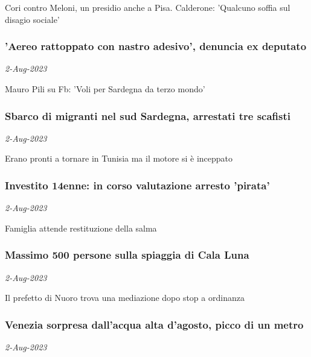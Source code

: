 Cori contro Meloni, un presidio anche a Pisa. Calderone: 'Qualcuno soffia sul disagio sociale'
\subsubsection{'Aereo rattoppato con nastro adesivo', denuncia ex deputato \href{https://www.ansa.it/sito/notizie/cronaca/2023/08/02/aereo-rattoppato-con-nastro-adesivo-denuncia-ex-deputato_18a14fb4-a29a-4e1f-8e12-03d2f6094a17.html}{}}
\textit{2-Aug-2023}

Mauro Pili su Fb: 'Voli per Sardegna da terzo mondo'
\subsubsection{Sbarco di migranti nel sud Sardegna, arrestati tre scafisti \href{https://www.ansa.it/sito/notizie/cronaca/2023/08/02/sbarco-di-migranti-nel-sud-sardegna-arrestati-tre-scafisti_6620a519-4687-46e4-98b9-65fbc0248696.html}{}}
\textit{2-Aug-2023}

Erano pronti a tornare in Tunisia ma il motore si \`{e} inceppato
\subsubsection{Investito 14enne: in corso valutazione arresto 'pirata' \href{https://www.ansa.it/sito/notizie/cronaca/2023/08/02/investito-14enne-in-corso-valutazione-arresto-pirata_c7e73b4e-58b7-4946-a551-a982b20171ab.html}{}}
\textit{2-Aug-2023}

Famiglia attende restituzione della salma
\subsubsection{Massimo 500 persone sulla spiaggia di Cala Luna \href{https://www.ansa.it/sito/notizie/cronaca/2023/08/02/massimo-500-persone-sulla-spiaggia-di-cala-luna_af6576ea-44f3-4833-a86a-ecaaecc27905.html}{}}
\textit{2-Aug-2023}

Il prefetto di Nuoro trova una mediazione dopo stop a ordinanza
\subsubsection{Venezia sorpresa dall'acqua alta d'agosto, picco di un metro \href{https://www.ansa.it/sito/notizie/cronaca/2023/08/02/venezia-sorpresa-dallacqua-alta-dagosto-picco-di-un-metro_a794f115-02f5-4098-ad6d-3f89e9d239b9.html}{}}
\textit{2-Aug-2023}

